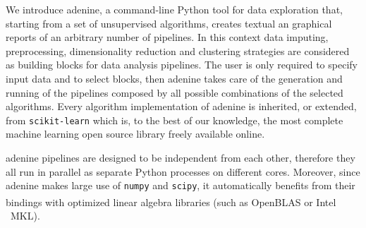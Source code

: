 \documentclass[twoside,11pt]{article}
\makeatletter
\newcommand{\ade}{{\sc adenine}\@\xspace}
\newcommand{\py}{{Python}\@\xspace}
\makeatother
\begin{document}


We introduce \ade, a command-line \py tool for data exploration that, starting from a set of unsupervised algorithms, creates textual an graphical reports of an arbitrary number of pipelines. In this context data imputing, preprocessing, dimensionality reduction and clustering strategies are considered as building blocks for data analysis pipelines. The user is only required to specify input data and to select blocks, then \ade takes care of the generation and running of the pipelines composed by all possible combinations of the selected algorithms. Every algorithm implementation of \ade is inherited, or extended, from \texttt{scikit-learn} \citep{scikit-learn} which is, to the best of our knowledge, the most complete machine learning open source library freely available online.

\ade pipelines are designed to be independent from each other, therefore they all run in parallel as separate \py processes on different cores.
Moreover, since \ade makes large use of \texttt{numpy} and \texttt{scipy}, it automatically benefits from their bindings with optimized linear algebra libraries (such as OpenBLAS or Intel \textsuperscript{\textregistered}~MKL).
\end{document}
